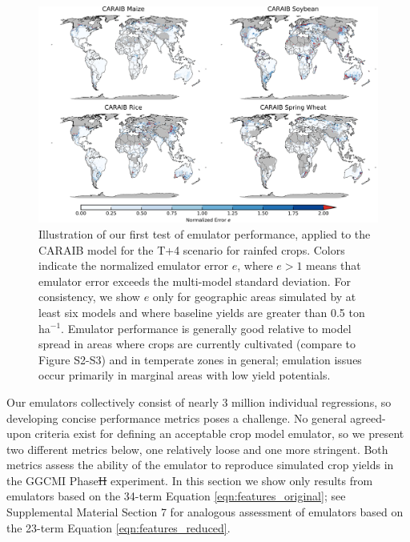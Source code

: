 \documentclass[gmdd]{copernicus} %
\providecommand{\DIFadd}[1]{{\protect\color{blue}\uwave{#1}}} %
\providecommand{\DIFdel}[1]{{\protect\color{red}\sout{#1}}}                      %
\providecommand{\DIFaddbegin}{} %
\providecommand{\DIFaddend}{} %
\providecommand{\DIFdelbegin}{} %
\providecommand{\DIFdelend}{} %
\providecommand{\DIFaddbeginFL}{} %
\providecommand{\DIFaddendFL}{} %
\providecommand{\DIFdelendFL}{} %
\begin{document}
    \DIFdelbegin %
\DIFdelendFL \DIFaddbeginFL \begin{figure}[h!]
        \DIFaddendFL \centering
            \includegraphics[width=16.3cm]{figures/CARAIB_spatial_error.png}
            \caption{
            Illustration of our first test of emulator performance, applied to the CARAIB model for the T+4 scenario for rainfed crops. 
            Colors indicate the normalized emulator error $e$, where $e > 1$ means that emulator error exceeds the multi-model standard deviation. 
            For consistency, we show $e$ only for geographic areas simulated by at least six models and where baseline yields are greater than 0.5 ton ha$^{-1}$.
            Emulator performance is generally good relative to model spread in areas where crops are currently cultivated (compare to Figure S2-S3) and in temperate zones in general; emulation issues occur primarily in marginal areas with low yield potentials. 
            }
           \label{fig:error}
        \end{figure}

Our emulators collectively consist of nearly 3 million individual regressions, so developing concise performance metrics poses a challenge.
No general agreed-upon criteria exist for defining an acceptable crop model emulator, so we present two different metrics below, one relatively loose and one more stringent.  
Both metrics assess the ability of the emulator to reproduce simulated crop yields in the GGCMI Phase\DIFdelbegin \DIFdel{II }\DIFdelend \DIFaddbegin \DIFadd{~2 }\DIFaddend experiment. 
In this section we show only results from emulators based on the 34-term Equation \ref{eqn:features_original};
see Supplemental Material Section 7 for analogous assessment of emulators based on the 23-term Equation \ref{eqn:features_reduced}.
\end{document}
